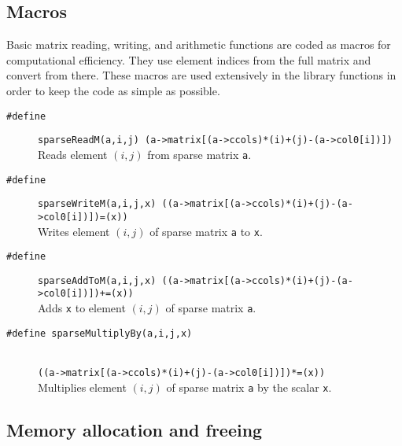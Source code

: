 \documentclass[11pt]{article}
\newcommand {\ttt} {\texttt}
\begin{document}
\subsection{Macros}

Basic matrix reading, writing, and arithmetic functions are coded as macros for computational efficiency. They use element indices from the full matrix and convert from there. These macros are used extensively in the library functions in order to keep the code as simple as possible.

\begin{description}

\item[\ttt{\#define}]
\verb!sparseReadM(a,i,j) (a->matrix[(a->ccols)*(i)+(j)-(a->col0[i])])!
\hfill \\
Reads element $(i,j)$ from sparse matrix \ttt{a}.

\item[\ttt{\#define}]
\verb!sparseWriteM(a,i,j,x) ((a->matrix[(a->ccols)*(i)+(j)-(a->col0[i])])=(x))!
\hfill \\
Writes element $(i,j)$ of sparse matrix \ttt{a} to \ttt{x}.

\item[\ttt{\#define}]
\verb!sparseAddToM(a,i,j,x) ((a->matrix[(a->ccols)*(i)+(j)-(a->col0[i])])+=(x))!
\hfill \\
Adds \ttt{x} to element $(i,j)$ of sparse matrix \ttt{a}.

\item[\ttt{\#define sparseMultiplyBy(a,i,j,x)}] \hfill \\
\verb!((a->matrix[(a->ccols)*(i)+(j)-(a->col0[i])])*=(x))!
\hfill \\
Multiplies element $(i,j)$ of sparse matrix \ttt{a} by the scalar \ttt{x}.

\end{description}


\subsection{Memory allocation and freeing}
\end{document}
